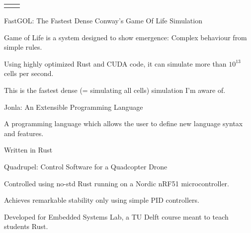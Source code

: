 \documentclass[11pt, a4paper]{awesome-cv}
\begin{document}
\begin{paracol}{2}
	\setlength{\tabcolsep}{0pt}
	\begin{tabular*}{\linewidth}{L{\linewidth / 2} L{\linewidth / 2}}
	\paragraphstyle {} &
	\paragraphstyle {} \\
	\end{tabular*}
	
	
	\ultracompactcventry
	{FastGOL: The Fastest Dense Conway's Game Of Life Simulation}
	{\begin{cvitems}
		\item Game of Life is a system designed to show emergence: Complex behaviour from simple rules.
		\item Using highly optimized Rust and CUDA code, it can simulate more than $10^{13}$ cells per second.
		\item This is the fastest dense (= simulating all cells) simulation I'm aware of.
	\end{cvitems}}
	
	\ultracompactcventry
	{Jonla: An Extensible Programming Language}
	{\begin{cvitems}
		\item A programming language which allows the user to define new language syntax and features.
		\item Written in Rust
	\end{cvitems}}
	
	\ultracompactcventry
	{Quadrupel: Control Software for a Quadcopter Drone}
	{\begin{cvitems}
		\item Controlled using no-std Rust running on a Nordic nRF51 microcontroller.
		\item Achieves remarkable stability only using simple PID controllers.
		\item Developed for Embedded Systems Lab, a TU Delft course meant to teach students Rust.
	\end{cvitems}}
	

\end{paracol}
\end{document}
